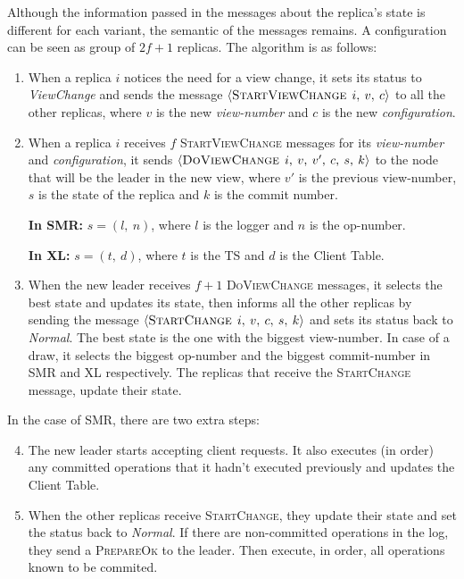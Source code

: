 \documentclass[times, 10pt,twocolumn]{article}
\begin{document}
 \label{view_change}
Although the information passed in the messages about the replica's state is different for each variant, the semantic of the messages remains. A configuration can be seen as group of $2f + 1$ replicas. The algorithm is as follows:

\begin{enumerate}
  \item When a replica $i$ notices the need for a view change, it sets its status
  to \textit{ViewChange} and sends the message 
  $\left \langle   \textsc{StartViewChange} \: \: i, \: v, \: c \right \rangle$ 
  to all  the other replicas, where $v$ is the new \textit{view-number} and $c$ is the new 
  \textit{configuration}.
  
  \item When a replica $i$ receives $f$ \textsc{StartViewChange} messages for its \textit{view-number}
  and \textit{configuration}, it sends $\left \langle   \textsc{DoViewChange} \: \: i, \: v, \: v', \: c, \: s, \: k \right \rangle$ to the node that will be the leader in the new view, where $v'$ is the previous view-number, $s$ is the state of the replica and $k$ is the commit number.
  
 \textbf{In SMR:} $s=\left ( l, \: n \right )$, where $l$ is the logger and $n$ is the op-number.
 
  \textbf{In XL:} $s=\left ( t, \: d \right )$, where $t$ is the TS and $d$ is the Client Table.
  
  \item When the new leader receives $f + 1$ \textsc{DoViewChange} messages, it selects the best state
  and updates its state, then informs all the other replicas by sending the message 
  $\left \langle   \textsc{StartChange} \: \: i, \: v, \: c, \: s, \: k \right \rangle$
  and sets its status back to \textit{Normal}. The best state is the one with the biggest view-number. 
  In case of a draw, it selects the biggest op-number and the biggest commit-number in 
  SMR and XL respectively.
  The replicas that receive the \textsc{StartChange} message, update their state.
 
\end{enumerate}

In the case of SMR, there are two extra steps:
\begin{enumerate}
  \setcounter{enumi}{3}
  \item The new leader starts accepting client requests. It also executes (in order) 
  any committed operations that it hadn’t executed previously and updates the Client Table.
  
  \item When the other replicas receive \textsc{StartChange}, they update their state and
  set the status back to \textit{Normal}. If there are non-committed operations in the log, they
  send a \textsc{PrepareOk} to the leader. Then execute, in order, all operations known
  to be commited.
\end{enumerate}
\end{document}
